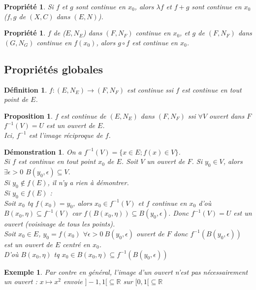 \documentclass[a4paper, oneside]{report}
\theoremstyle{break}
\newtheorem{defi}[thm]{Définition}
\newtheorem{propr}[thm]{Propriété}
\newtheorem{propo}[thm]{Proposition}
\newtheorem{exem}[thm]{Exemple}
\newtheorem*{demo}{Démonstration}
\newcommand{\R}{\mathbb{R}}
\begin{document}
\begin{propr}
Si $f$ et $g$ sont continue en $x_0$, alors $\lambda f$ et $f+g$ sont continue en $x_0$ ($f,g$ de $(X,C)$ dans $(E,N)$).
\end{propr}


\begin{propr}
$f$ de ($E,N_E$) dans $(F,N_F)$ continue en $x_0$, et $g$ de $(F,N_F)$ dans $(G,N_G)$ continue en $f(x_0)$, alors $g\circ f$ est continue en $x_0$.
\end{propr} 


\subsection{Propriétés globales}

\begin{defi}
$f:(E,N_E)\rightarrow (F,N_F)$ est continue ssi $f$ est continue en tout point de $E$.
\end{defi}
\begin{propo}
$f$ est continue de $(E,N_E)$ dans $(F,N_F)$ ssi $\forall V$ ouvert dans $F$ $f^{-1}(V)=U$ est un ouvert de $E$.\\
Ici, $f^{-1}$ est l'image réciproque de $f$.
\end{propo}


\begin{demo}
On a $f^{-1}(V)=\{x\in E; f(x)\in V \}$.\\

Si $f$ est continue en tout point $x_0$ de $E$. Soit $V$ un ouvert de $F$. Si $y_0 \in V$, alors $\exists \epsilon >0$ $B(y_0,\epsilon)\subseteq V$.\\
Si $y_0 \notin f(E)$, il n'y a rien à démontrer.\\
Si $y_0\in f(E)$ :\\
Soit $x_0$ tq $f(x_0)=y_0$, alors $x_0\in f^{-1}(V)$ et $f$ continue en $x_0$ d'où $B(x_0,\eta) \subseteq f^{-1}(V)$ car $f(B(x_0,\eta))\subseteq B(y_0,\epsilon)$. Donc $f^{-1}(V)=U$ est un ouvert (voisinage de tous les points).\\

Soit $x_0\in E$, $y_0=f(x_0)$ $\forall \epsilon >0~B(y_0,\epsilon)$ ouvert de $F$ donc $f^{-1}(B(y_0,\epsilon))$ est un ouvert de $E$ centré en $x_0$.\\
D'où $B(x_0,\eta)$ tq $x_0 \in B(x_0,\eta)\subseteq f^{-1}(B(y_0,\epsilon))$
\end{demo}


\begin{exem}

Par contre en général, l'image d'un ouvert n'est pas nécessairement un ouvert :
$x\mapsto x^2$ envoie $]-1,1[\subseteq\R$ sur $[0,1[\subseteq \R$
\end{exem}
\end{document}
